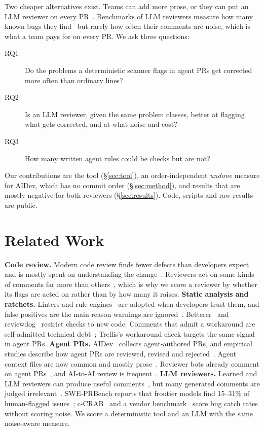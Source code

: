 \documentclass[sigconf]{acmart}
\begin{document}
Two cheaper alternatives exist. Teams can add more prose, or they can put an LLM reviewer on every PR~\cite{greptilebench}. Benchmarks of LLM reviewers measure how many known bugs they find~\cite{sweprbench,ccrab,greptilebench} but rarely how often their comments are noise, which is what a team pays for on every PR. We ask three questions:
\begin{description}
\item[RQ1] Do the problems a deterministic scanner flags in agent PRs get corrected more often than ordinary lines?
\item[RQ2] Is an LLM reviewer, given the same problem classes, better at flagging what gets corrected, and at what noise and cost?
\item[RQ3] How many written agent rules could be checks but are not?
\end{description}
Our contributions are the tool (\S\ref{sec:tool}), an order-independent \emph{undone} measure for AIDev, which has no commit order (\S\ref{sec:method}), and results that are mostly negative for both reviewers (\S\ref{sec:results}). Code, scripts and raw results are public.

\section{Related Work}
\textbf{Code review.} Modern code review finds fewer defects than developers expect and is mostly spent on understanding the change~\cite{bacchelli2013expectations}. Reviewers act on some kinds of comments far more than others~\cite{goldman2025resolve}, which is why we score a reviewer by whether its flags are acted on rather than by how many it raises.
\textbf{Static analysis and ratchets.} Linters and rule engines~\cite{semgrep} are adopted when developers trust them, and false positives are the main reason warnings are ignored~\cite{johnson2013why,sadowski2018lessons}. Betterer~\cite{betterer} and reviewdog~\cite{reviewdog} restrict checks to new code. Comments that admit a workaround are self-admitted technical debt~\cite{potdar2014satd}; Trellis's workaround check targets the same signal in agent PRs.
\textbf{Agent PRs.} AIDev~\cite{li2026aidev} collects agent-authored PRs, and empirical studies describe how agent PRs are reviewed, revised and rejected~\cite{watanabe2025agentic,ehsani2026fail,duma2026humans}. Agent context files are now common and mostly prose~\cite{chatlatanagulchai2025agentreadmes}. Reviewer bots already comment on agent PRs~\cite{fatima2026reviewerbots}, and AI-to-AI review is frequent~\cite{ai2ai}.
\textbf{LLM reviewers.} Learned and LLM reviewers can produce useful comments~\cite{tufano2024dlreview,vijayvergiya2024autocommenter}, but many generated comments are judged irrelevant~\cite{heumuller2025relevance}. SWE-PRBench reports that frontier models find 15--31\% of human-flagged issues~\cite{sweprbench}; c-CRAB~\cite{ccrab} and a vendor benchmark~\cite{greptilebench} score bug catch rates without scoring noise. We score a deterministic tool and an LLM with the same noise-aware measure.
\end{document}
